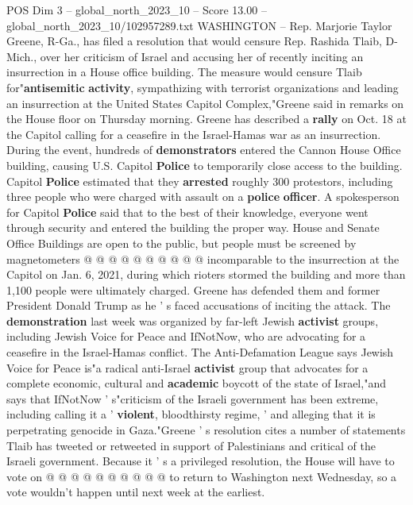 \begin{textsample}{POS Dim 3 – global\_north\_2023\_10 – Score 13.00 – global\_north\_2023\_10/102957289.txt}  \label{ex:f3_pos_206}
WASHINGTON -- Rep.
Marjorie Taylor Greene, R-Ga., has filed a resolution that would censure Rep.
Rashida Tlaib, D-Mich., over her criticism of Israel and accusing her of recently inciting an insurrection in a House office building.
The measure would censure Tlaib for"\textbf{antisemitic} \textbf{activity}, sympathizing with terrorist organizations and leading an insurrection at the United States Capitol Complex,"Greene said in remarks on the House floor on Thursday morning.
Greene has described a \textbf{rally} on Oct. 18 at the Capitol calling for a ceasefire in the Israel-Hamas war as an insurrection.
During the event, hundreds of \textbf{demonstrators} entered the Cannon House Office building, causing U.S.
Capitol \textbf{Police} to temporarily close access to the building.
Capitol \textbf{Police} estimated that they \textbf{arrested} roughly 300 protestors, including three people who were charged with assault on a \textbf{police} \textbf{officer}.
A spokesperson for Capitol \textbf{Police} said that to the best of their knowledge, everyone went through security and entered the building the proper way.
House and Senate Office Buildings are open to the public, but people must be screened by magnetometers @ @ @ @ @ @ @ @ @ @ incomparable to the insurrection at the Capitol on Jan. 6, 2021, during which rioters stormed the building and more than 1,100 people were ultimately charged.
Greene has defended them and former President Donald Trump as he ' s faced accusations of inciting the attack.
The \textbf{demonstration} last week was organized by far-left Jewish \textbf{activist} groups, including Jewish Voice for Peace and IfNotNow, who are advocating for a ceasefire in the Israel-Hamas conflict.
The Anti-Defamation League says Jewish Voice for Peace is"a radical anti-Israel \textbf{activist} group that advocates for a complete economic, cultural and \textbf{academic} boycott of the state of Israel,"and says that IfNotNow ' s"criticism of the Israeli government has been extreme, including calling it a ' \textbf{violent}, bloodthirsty regime, ' and alleging that it is perpetrating genocide in Gaza."Greene ' s resolution cites a number of statements Tlaib has tweeted or retweeted in support of Palestinians and critical of the Israeli government.
Because it ' s a privileged resolution, the House will have to vote on @ @ @ @ @ @ @ @ @ @ to return to Washington next Wednesday, so a vote wouldn't happen until next week at the earliest.

\end{textsample}
